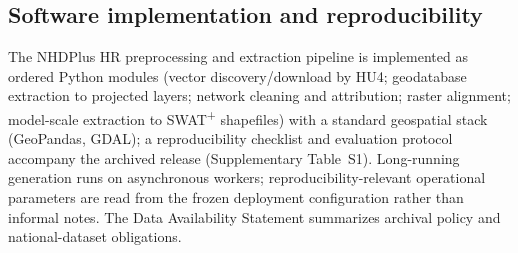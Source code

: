 \subsection{Software implementation and reproducibility}
\label{sec:methods-software}

The NHDPlus HR preprocessing and extraction pipeline is implemented as ordered Python modules (vector discovery/download by HU4; geodatabase extraction to projected layers; network cleaning and attribution; raster alignment; model-scale extraction to SWAT\textsuperscript{+} shapefiles) with a standard geospatial stack (GeoPandas, GDAL); a reproducibility checklist and evaluation protocol accompany the archived release (Supplementary Table~S1). Long-running generation runs on asynchronous workers; reproducibility-relevant operational parameters are read from the frozen deployment configuration rather than informal notes. The Data Availability Statement summarizes archival policy and national-dataset obligations.
